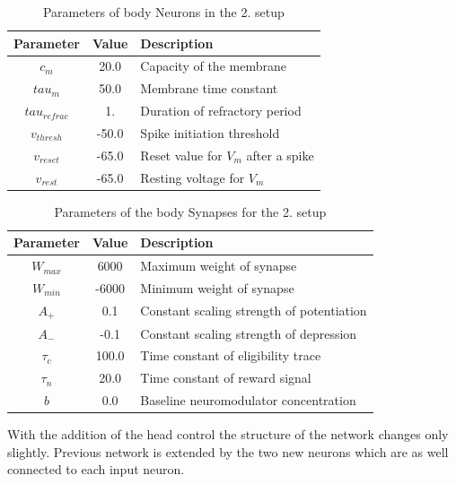\begin{table}[htpb]
  \centering
  \caption[Parameters 2.Setup]{Parameters of body Neurons in the 2. setup} \label{tab:ParamsBase2N}
  \begin{tabular}{|c| c |l|}
      \toprule
      Parameter & Value & Description \\
      \midrule
      $c_m$   & 20.0  & Capacity of the membrane \\
      $tau_{m}$    & 50.0  & Membrane time constant \\
      $tau_{refrac}$   & 1.  & Duration of refractory period\\
      $v_{thresh}$   & -50.0  & Spike initiation threshold \\
      $v_{reset}$    & -65.0  &  Reset value for $V_m$ after a spike \\
      $v_{rest}$ & -65.0 & Resting voltage for $V_m$ \\
      \bottomrule
    \end{tabular}
    \end{table}
  \begin{table}[htpb]
  \centering
  \caption[Parameters 2.Setup]{Parameters of the body Synapses for the 2. setup} \label{tab:ParamsBase2S}
    \begin{tabular}{|c| c |l|}
        \toprule
        Parameter  & Value & Description \\
        \midrule
        $W_{max}$ & 6000   & Maximum weight of synapse\\   
        $W_{min}$ & -6000  & Minimum weight of synapse\\   
        $A_{+}$   & 0.1    & Constant scaling strength of potentiation\\   
        $A_{-}$   & -0.1   & Constant scaling strength of depression \\   
        $\tau_c$  & 100.0   & Time constant of eligibility trace \\  
        $\tau_n$  & 20.0   & Time constant of reward signal  \\   
        $b$       & 0.0    & Baseline neuromodulator concentration \\    
        \bottomrule
    \end{tabular}
    \end{table}
With the addition of the head control the structure of the network changes only slightly. Previous network is extended by the two new neurons which are as well connected to each input neuron.

